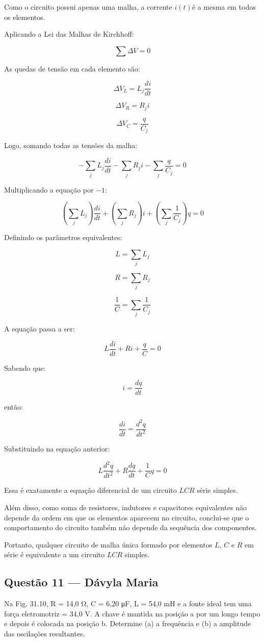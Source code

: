 \documentclass[12pt,a4paper]{article}
\begin{document}
\vspace{0.3cm}

Como o circuito possui apenas uma malha, a corrente $i(t)$é a mesma em todos os elementos.

Aplicando a Lei das Malhas de Kirchhoff:

\[
\sum \Delta V = 0
\]

As quedas de tensão em cada elemento são:

\[
\Delta V_L = L_j \frac{di}{dt}
\]

\[
\Delta V_R = R_j i
\]

\[
\Delta V_C = \frac{q}{C_j}
\]

Logo, somando todas as tensões da malha:

\[
-\sum_j L_j \frac{di}{dt}
-\sum_j R_j i
-\sum_j \frac{q}{C_j}
=0
\]

Multiplicando a equação por $-1$:

\[
\left( \sum_j L_j \right)\frac{di}{dt}
+
\left( \sum_j R_j \right)i
+
\left( \sum_j \frac{1}{C_j} \right) q
=0
\]

Definindo os parâmetros equivalentes:

\[
L = \sum_j L_j
\]

\[
R = \sum_j R_j
\]

\[
\frac{1}{C} = \sum_j \frac{1}{C_j}
\]

A equação passa a ser:

\[
L\frac{di}{dt}+Ri+\frac{q}{C}=0
\]

Sabendo que:

\[
i=\frac{dq}{dt}
\]

então:

\[
\frac{di}{dt}=\frac{d^2q}{dt^2}
\]

Substituindo na equação anterior:

\[
L\frac{d^2q}{dt^2}
+
R\frac{dq}{dt}
+
\frac{1}{C}q
=0
\]

Essa é exatamente a equação diferencial de um circuito $LCR$ série simples.

Além disso, como soma de resistores, indutores e capacitores equivalentes não depende da ordem em que os elementos aparecem no circuito, conclui-se que o comportamento do circuito também não depende da sequência dos componentes.

Portanto, qualquer circuito de malha única formado por elementos $L$, $C$ e $R$ em série é equivalente a um circuito $LCR$ simples. 



\subsection{Questão 11 — Dávyla Maria}
Na Fig. 31.10, R = 14,0 Ω, C = 6,20 μF, L = 54,0 mH e a fonte ideal tem uma força eletromotriz = 34,0 V. A chave é mantida na posição a por um longo tempo e depois é colocada na posição b. Determine (a) a frequência e (b) a amplitude das oscilações resultantes.
\end{document}
